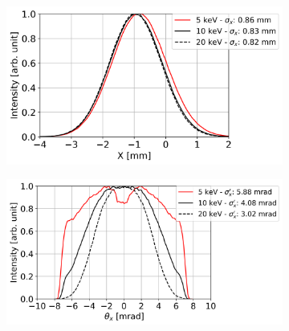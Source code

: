 \begin{figure}[ht]  %
\begin{subfigure}{0.5\textwidth}
\includegraphics[width=\linewidth]{./../../beam_snapshots/3PW/sigmaX.png}
\end{subfigure}
\hfill %
\begin{subfigure}{0.5\textwidth}
\includegraphics[width=\linewidth]{./../../beam_snapshots/3PW/sigmaXp.png}
\end{subfigure}


\end{figure}
